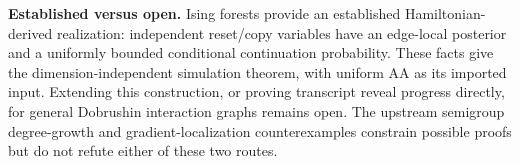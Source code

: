 \textbf{Established versus open.} Ising forests provide an established
Hamiltonian-derived realization: independent reset/copy variables have
an edge-local posterior and a uniformly bounded conditional
continuation probability. These facts give the dimension-independent
simulation theorem, with uniform AA as its imported input. Extending
this construction, or proving transcript reveal progress directly,
for general Dobrushin interaction graphs remains open. The upstream
semigroup degree-growth and gradient-localization counterexamples
constrain possible proofs but do not refute either of these two routes.
